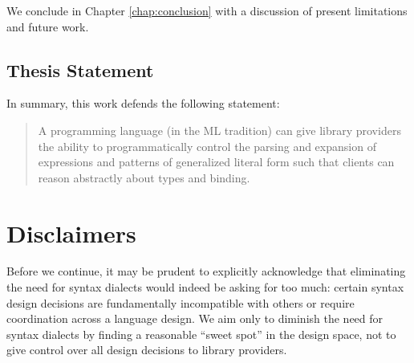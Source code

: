 
We conclude in Chapter \ref{chap:conclusion} with a discussion of present limitations and future work.

\subsection{Thesis Statement}
In summary, this work defends the following statement:

\begin{quote}
A programming language (in the ML tradition) can give library providers the ability to %
programmatically control the parsing and expansion of expressions and patterns of generalized literal form such that clients can reason abstractly about types and binding. %
\end{quote}

\section{Disclaimers}
Before we continue, it may be prudent to explicitly acknowledge that eliminating the need for syntax dialects would indeed be asking for too much: certain syntax design decisions are fundamentally incompatible with others or require coordination across a language design. We aim only to diminish the need for syntax dialects by finding a reasonable ``sweet spot'' in the design space, not to give control over all design decisions to library providers. %

